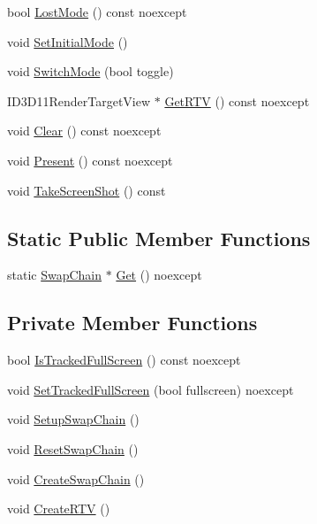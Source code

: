 \begin{DoxyCompactItemize}
\item 
bool \hyperlink{classmage_1_1_swap_chain_aba3697d2b641b99f7e89fcc59613f89d}{Lost\+Mode} () const noexcept
\item 
void \hyperlink{classmage_1_1_swap_chain_a662009705a6e23064351fd0d9b77ef0e}{Set\+Initial\+Mode} ()
\item 
void \hyperlink{classmage_1_1_swap_chain_ada1b8857eeac3d00287fb624645e365e}{Switch\+Mode} (bool toggle)
\item 
I\+D3\+D11\+Render\+Target\+View $\ast$ \hyperlink{classmage_1_1_swap_chain_a0b54dff5a39f10d9073bdbb1121a6144}{Get\+R\+TV} () const noexcept
\item 
void \hyperlink{classmage_1_1_swap_chain_a94b28938ba9e402665197a71409ae43a}{Clear} () const noexcept
\item 
void \hyperlink{classmage_1_1_swap_chain_a477d34baf72331aeff23f32cd34518b6}{Present} () const noexcept
\item 
void \hyperlink{classmage_1_1_swap_chain_a23a4618b5104203c5a5c962696ae3b53}{Take\+Screen\+Shot} () const
\end{DoxyCompactItemize}
\subsection*{Static Public Member Functions}
\begin{DoxyCompactItemize}
\item 
static \hyperlink{classmage_1_1_swap_chain}{Swap\+Chain} $\ast$ \hyperlink{classmage_1_1_swap_chain_a9ed25cd34dedc97e25e26e58456ac2fe}{Get} () noexcept
\end{DoxyCompactItemize}
\subsection*{Private Member Functions}
\begin{DoxyCompactItemize}
\item 
bool \hyperlink{classmage_1_1_swap_chain_ad3b35e10612f7219cc4b6d61039e2f8c}{Is\+Tracked\+Full\+Screen} () const noexcept
\item 
void \hyperlink{classmage_1_1_swap_chain_ae2689c07632f1fdc8367c9eefd62851b}{Set\+Tracked\+Full\+Screen} (bool fullscreen) noexcept
\item 
void \hyperlink{classmage_1_1_swap_chain_aec2b14bc569046174f6a416a7f20c8d5}{Setup\+Swap\+Chain} ()
\item 
void \hyperlink{classmage_1_1_swap_chain_a30b25245e86823e1b08a39887de8d918}{Reset\+Swap\+Chain} ()
\item 
void \hyperlink{classmage_1_1_swap_chain_a9474cae31868f020c76439febc6e1afd}{Create\+Swap\+Chain} ()
\item 
void \hyperlink{classmage_1_1_swap_chain_a9cdb798d8911e2f1239ad7eb79cc6b87}{Create\+R\+TV} ()
\end{DoxyCompactItemize}
